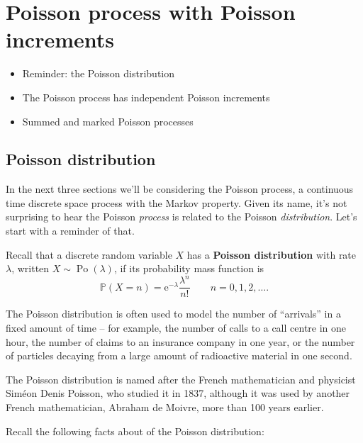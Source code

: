 \documentclass[
  a4paper,
]{article}
\providecommand{\tightlist}{%
  \setlength{\itemsep}{0pt}\setlength{\parskip}{0pt}}
\theoremstyle{definition}
\theoremstyle{definition}
\theoremstyle{definition}
\theoremstyle{remark}
\begin{document}
\hypertarget{S13-poisson-poisson}{%
\section{Poisson process with Poisson increments}\label{S13-poisson-poisson}}

\begin{itemize}
\tightlist
\item
  Reminder: the Poisson distribution
\item
  The Poisson process has independent Poisson increments
\item
  Summed and marked Poisson processes
\end{itemize}

\newcommand{\Po}{\operatorname{Po}}
\newcommand{\ee}{\mathrm{e}}

\hypertarget{poisson-dist}{%
\subsection{Poisson distribution}\label{poisson-dist}}

In the next three sections we'll be considering the Poisson process, a continuous time discrete space process with the Markov property. Given its name, it's not surprising to hear the Poisson \emph{process} is related to the Poisson \emph{distribution}. Let's start with a reminder of that.

Recall that a discrete random variable \(X\) has a \textbf{Poisson distribution} with rate \(\lambda\), written \(X \sim \operatorname{Po}(\lambda)\), if its probability mass function is
\[ \mathbb P(X = n) = \mathrm{e}^{-\lambda} \frac{\lambda^n}{n!} \qquad n = 0,1,2,\dots. \]

The Poisson distribution is often used to model the number of ``arrivals'' in a fixed amount of time -- for example, the number of calls to a call centre in one hour, the number of claims to an insurance company in one year, or the number of particles decaying from a large amount of radioactive material in one second.

The Poisson distribution is named after the French mathematician and physicist Siméon Denis Poisson, who studied it in 1837, although it was used by another French mathematician, Abraham de Moivre, more than 100 years earlier.

Recall the following facts about of the Poisson distribution:
\end{document}
